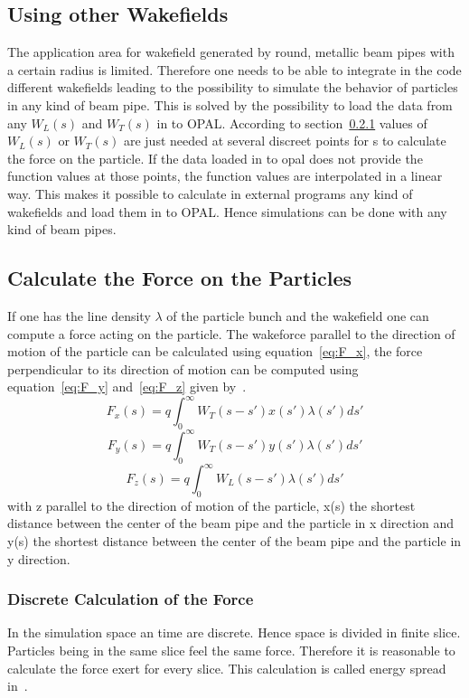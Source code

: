\documentclass[11pt,a4paper]{article}
\newcommand{\opal}{\textsc{OPAL}}
\begin{document}
\subsection{Using other Wakefields}
The application area for wakefield generated by round, metallic beam pipes with a certain radius is limited. Therefore one needs to be able to integrate in the code different wakefields leading to the possibility to simulate the behavior of particles in any kind of beam pipe.
This is solved by the possibility to load the data from any $W_L(s)$ and $W_T(s)$ in to \opal.
According to section~\ref{sec:Disc_Calc_Force}  values of $W_L(s)$ or $W_T(s)$ are just needed at several discreet points for s to calculate the force on the particle. If the data loaded in to opal does not provide the function values at those points, the function values are interpolated in a linear way.
This makes it possible to calculate in external programs any kind of wakefields and load them in to \opal. Hence simulations can be done with any kind of beam pipes.

\subsection{Calculate the Force on the Particles}
\label{sec:Calc_Force}

If one has the line density $\lambda$ of the particle bunch and the wakefield one can compute a force acting on the particle. The wakeforce parallel to the direction of motion of the particle can be calculated using equation~\eqref{eq:F_x}, the force perpendicular to its direction of motion can be computed using equation~\eqref{eq:F_y} and~\eqref{eq:F_z} given by~\cite{impact}.
\begin{equation} \label{eq:F_x}
F_x(s) = q\int_0^\infty W_T(s-s')x(s')\lambda(s')ds'
\end{equation}
\begin{equation} \label{eq:F_y}
F_y(s) = q\int_0^\infty W_T(s-s')y(s')\lambda(s')ds'
\end{equation}
\begin{equation} \label{eq:F_z}
F_z(s) = q\int_0^\infty W_L(s-s')\lambda(s')ds'
\end{equation}
with z parallel to the direction of motion of the particle, x(s) the shortest distance between the center of the beam pipe and the particle in x direction and y(s) the shortest distance between the center of the beam pipe and the particle in y direction.


\subsubsection{Discrete Calculation of the Force}
\label{sec:Disc_Calc_Force}
In the simulation space an time are discrete. Hence space is divided in finite slice. Particles being in the same slice feel the same force. Therefore it is reasonable to calculate the force exert for every slice. This calculation is called energy spread in~\cite{notebook}.
\end{document}
